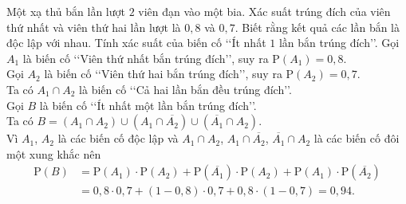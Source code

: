\begin{bt}%

    Một xạ thủ bắn lần lượt $2$ viên đạn vào một bia. Xác suất trúng đích của viên thứ nhất và viên thứ hai lần lượt là $0{,}8$ và $0{,}7$. Biết rằng kết quả các lần bắn là độc lập với nhau. Tính xác suất của biến cố \lq\lq Ít nhất $1$ lần bắn trúng đích\rq\rq.
    \loigiai
    {
        Gọi $A_1$ là biến cố \lq\lq Viên thứ nhất bắn trúng đích\rq\rq, suy ra $\mathrm{P}\left(A_1\right)=0{,}8$.\\
        Gọi $A_2$ là biến cố \lq\lq Viên thứ hai bắn trúng đích\rq\rq, suy ra $\mathrm{P}\left(A_2\right)=0{,}7$.\\
        Ta có $A_1\cap A_2$ là biến cố \lq\lq Cả hai lần bắn đều trúng đích\rq\rq.\\
        Gọi $B$ là biến cố \lq\lq Ít nhất một lần bắn trúng đích\rq\rq.\\
        Ta có $B=\left(A_1\cap A_2\right)\cup\left(A_1\cap\overline{A_2}\right)\cup\left(\overline{A_1}\cap A_2\right)$.\\
        Vì $A_1$, $A_2$ là các biến cố độc lập và $A_1\cap A_2$, $ A_1\cap\overline{A_2}$, $\overline{A_1}\cap A_2$ là các biến cố đôi một xung khắc nên
        $$\begin{aligned}
            \mathrm{P}(B)
            &=\mathrm{P}\left(A_1\right)\cdot\mathrm{P}\left(A_2\right)+\mathrm{P}\left(\overline{A_1}\right)\cdot\mathrm{P}\left(A_2\right)+\mathrm{P}\left(A_1\right)\cdot\mathrm{P}\left(\overline{A_2}\right) \\
            &=0{,}8\cdot0{,}7+\left(1-0{,}8\right)\cdot0{,}7+0{,}8\cdot\left(1-0{,}7\right)=0{,}94.
        \end{aligned}$$
    }
\end{bt}

